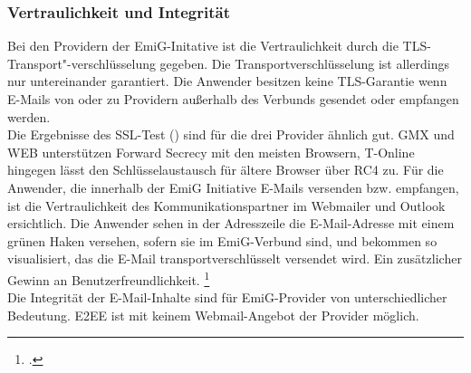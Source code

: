 \documentclass  [paper=a4,
				fontsize=12pt,
				listof=totoc,
				bibliography=totoc
				]{scrreprt}
\begin{document}
		\subsubsection{Vertraulichkeit und Integrität}		
			Bei den Providern der EmiG-Initative ist die Vertraulichkeit durch die TLS-Transport"-verschlüsselung gegeben. 
			Die Transportverschlüsselung ist allerdings nur untereinander garantiert. 
			Die Anwender besitzen keine \ac{TLS}-Garantie wenn E-Mails von oder zu Providern außerhalb des Verbunds gesendet oder empfangen werden.\\

			Die Ergebnisse des \ac{SSL}-Test () sind für die drei Provider ähnlich gut. GMX und WEB unterstützen Forward Secrecy mit den meisten Browsern, T-Online hingegen lässt den Schlüsselaustausch für ältere Browser über RC4 zu.
			Für die Anwender, die innerhalb der EmiG Initiative E-Mails versenden bzw. empfangen, ist die Vertraulichkeit des Kommunikationspartner im Webmailer und Outlook ersichtlich.
			Die Anwender sehen in der Adresszeile die E-Mail-Adresse mit einem grünen Haken versehen, sofern sie im \ac{EmiG}-Verbund sind, und bekommen so visualisiert, das die E-Mail transportverschlüsselt versendet wird. Ein zusätzlicher Gewinn an Benutzerfreundlichkeit.
			\footcite[Vgl.][]{Zivadino14-1}\medskip\\
			Die Integrität der E-Mail-Inhalte sind für \ac{EmiG}-Provider von unterschiedlicher Bedeutung.
			\ac{E2EE} ist mit keinem Webmail-Angebot der Provider möglich.
\end{document}
